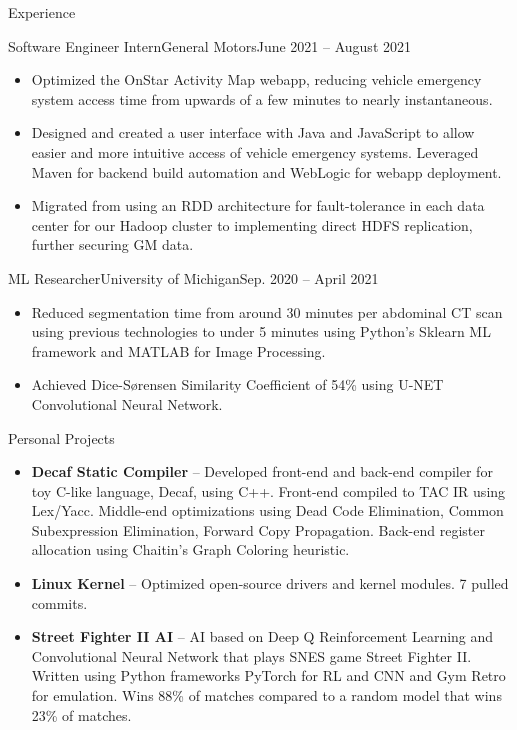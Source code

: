 \documentclass[]{mcdowellcv}
\begin{document}
\begin{cvsection}{Experience}
		\begin{cvsubsection}{Software Engineer Intern}{General Motors}{June 2021 -- August 2021}
			\small{
				\begin{itemize}
					\item Optimized the OnStar Activity Map webapp, reducing vehicle emergency system access time from upwards of a few minutes to nearly instantaneous.
					\item Designed and created a user interface with Java and JavaScript to allow easier and more intuitive access of vehicle emergency systems. Leveraged Maven for backend build automation and WebLogic for webapp deployment.
					\item Migrated from using an RDD architecture for fault-tolerance in each data center for our Hadoop cluster to implementing direct HDFS replication, further securing GM data.
				\end{itemize}
			}
		\end{cvsubsection}
		
		\begin{cvsubsection}{ML Researcher}{University of Michigan}{Sep. 2020 -- April 2021}
			\small{
				\begin{itemize}
					\item Reduced segmentation time from around 30 minutes per abdominal CT scan using previous technologies to under 5 minutes using Python's Sklearn ML framework and MATLAB for Image Processing.
					\item Achieved Dice-Sørensen Similarity Coefficient of 54\% using U-NET Convolutional Neural Network.
				\end{itemize}
			}
		\end{cvsubsection}
	\end{cvsection}
	
	\begin{cvsection}{Personal Projects}
		\begin{cvsubsection}{}{}{}	
			\small{
				\begin{itemize}
					\item \textbf{Decaf Static Compiler} -- Developed front-end and back-end compiler for toy C-like language, Decaf, using C++. Front-end compiled to TAC IR using Lex/Yacc. Middle-end optimizations using Dead Code Elimination, Common Subexpression Elimination, Forward Copy Propagation. Back-end register allocation using Chaitin's Graph Coloring heuristic.
					\item \textbf{Linux Kernel} -- Optimized open-source drivers and kernel modules. 7 pulled commits.
					\item \textbf{Street Fighter II AI} -- AI based on Deep Q Reinforcement Learning and Convolutional Neural Network that plays SNES game Street Fighter II. Written using Python frameworks PyTorch for RL and CNN and Gym Retro for emulation. Wins 88\% of matches compared to a random model that wins 23\% of matches.
				\end{itemize}
			}
		\end{cvsubsection}
	\end{cvsection}
\end{document}
